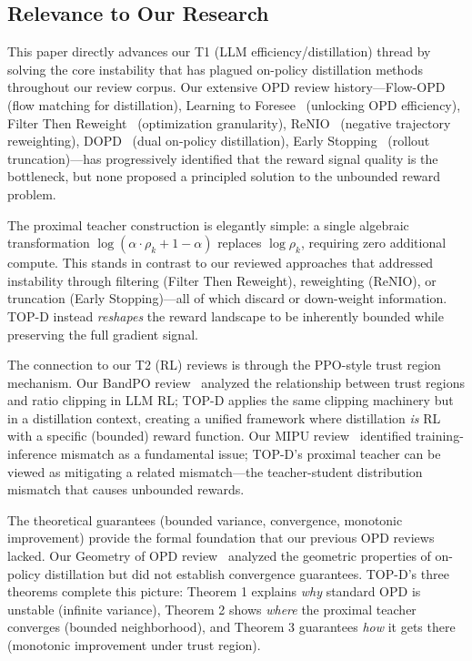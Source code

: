 \documentclass[11pt,a4paper]{article}
\begin{document}
\subsection{Relevance to Our Research}

This paper directly advances our T1 (LLM efficiency/distillation) thread by solving the core instability that has plagued on-policy distillation methods throughout our review corpus. Our extensive OPD review history---Flow-OPD~\cite{flowopd2026} (flow matching for distillation), Learning to Foresee~\cite{foresee2026} (unlocking OPD efficiency), Filter Then Reweight~\cite{filter2026} (optimization granularity), ReNIO~\cite{renio2026} (negative trajectory reweighting), DOPD~\cite{dopd2026} (dual on-policy distillation), Early Stopping~\cite{earlystop2026} (rollout truncation)---has progressively identified that the reward signal quality is the bottleneck, but none proposed a principled solution to the unbounded reward problem.

The proximal teacher construction is elegantly simple: a single algebraic transformation $\log(\alpha \cdot \rho_k + 1 - \alpha)$ replaces $\log \rho_k$, requiring zero additional compute. This stands in contrast to our reviewed approaches that addressed instability through filtering (Filter Then Reweight), reweighting (ReNIO), or truncation (Early Stopping)---all of which discard or down-weight information. TOP-D instead \emph{reshapes} the reward landscape to be inherently bounded while preserving the full gradient signal.

The connection to our T2 (RL) reviews is through the PPO-style trust region mechanism. Our BandPO review~\cite{bandpo2026} analyzed the relationship between trust regions and ratio clipping in LLM RL; TOP-D applies the same clipping machinery but in a distillation context, creating a unified framework where distillation \emph{is} RL with a specific (bounded) reward function. Our MIPU review~\cite{mirage2026} identified training-inference mismatch as a fundamental issue; TOP-D's proximal teacher can be viewed as mitigating a related mismatch---the teacher-student distribution mismatch that causes unbounded rewards.

The theoretical guarantees (bounded variance, convergence, monotonic improvement) provide the formal foundation that our previous OPD reviews lacked. Our Geometry of OPD review~\cite{geomopd2026} analyzed the geometric properties of on-policy distillation but did not establish convergence guarantees. TOP-D's three theorems complete this picture: Theorem 1 explains \emph{why} standard OPD is unstable (infinite variance), Theorem 2 shows \emph{where} the proximal teacher converges (bounded neighborhood), and Theorem 3 guarantees \emph{how} it gets there (monotonic improvement under trust region).
\end{document}
